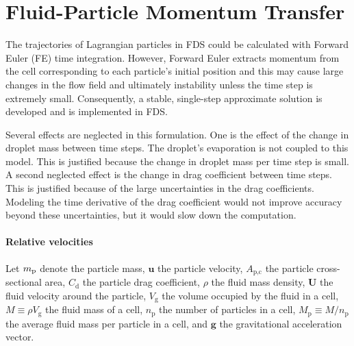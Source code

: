 \chapter{Fluid-Particle Momentum Transfer}
\label{particle_momentum_transfer}

The trajectories of Lagrangian particles in FDS could be calculated with Forward Euler (FE) time integration. However, Forward Euler extracts momentum from the cell corresponding to each particle's initial position and this may cause large changes in the flow field and ultimately instability unless the time step is extremely small. Consequently, a stable, single-step approximate solution is developed and is implemented in FDS.

Several effects are neglected in this formulation. One is the effect of the change in droplet mass between  time steps. The droplet's evaporation is not coupled to this model. This is justified because the change in droplet mass per time step is small. A second neglected effect is the change in drag coefficient between time steps. This is justified because of the large uncertainties in the drag coefficients. Modeling the time derivative of the drag coefficient would not improve accuracy beyond these uncertainties, but it would slow down the computation.

\subsubsection*{Relative velocities}
Let $m_{\rm p}$ denote the particle mass, $\mathbf{u}$ the particle velocity, $A_\text{p,c}$ the particle cross-sectional area, $C_\text{d}$ the particle drag coefficient, $\rho$ the fluid mass density, $\mathbf{U}$ the fluid velocity around the particle, $V_\text{g}$ the volume occupied by the fluid in a cell, $M \equiv \rho V_\text{g}$ the fluid mass of a cell, $n_\text{p}$ the number of particles in a cell, $M_\text{p} \equiv M/n_\text{p}$ the average fluid mass per particle in a cell, and $\mathbf{g}$ the gravitational acceleration vector.

